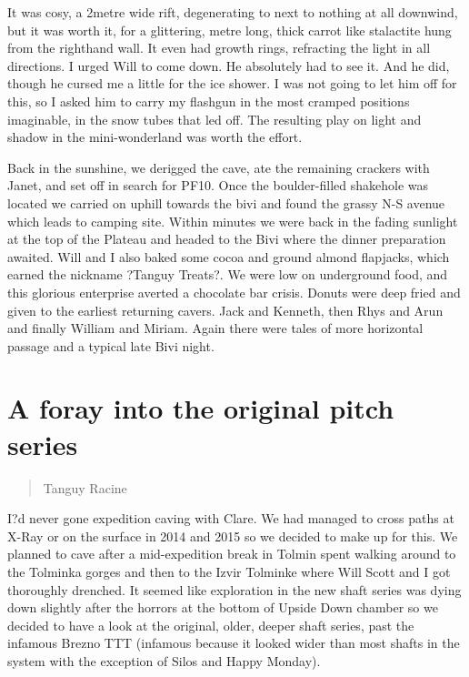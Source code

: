 \documentclass[onecolumn]{book}
\begin{document}
It was cosy, a 2metre wide rift, degenerating to next to nothing at all downwind, but it was worth it, for a glittering, metre long, thick carrot like stalactite hung from the righthand wall. It even had growth rings, refracting the light in all directions. I urged Will to come down. He absolutely had to see it. And he did, though he cursed me a little for the ice shower. I was not going to let him off for this, so I asked him to carry my flashgun in the most cramped positions imaginable, in the snow tubes that led off. The resulting play on light and shadow in the mini-wonderland was worth the effort.

Back in the sunshine, we derigged the cave, ate the remaining crackers with Janet, and set off in search for PF10. Once the boulder-filled shakehole was located we carried on uphill towards the bivi and found the grassy N-S avenue which leads to camping site. Within minutes we were back in the fading sunlight at the top of the Plateau and headed to the Bivi where the dinner preparation awaited. Will and I also baked some cocoa and ground almond flapjacks, which earned the nickname ?Tanguy Treats?. We were low on underground food, and this glorious enterprise averted a chocolate bar crisis. Donuts were deep fried and given to the earliest returning cavers. Jack and Kenneth, then Rhys and Arun and finally William and Miriam. Again there were tales of more horizontal passage and a typical late Bivi night.


\section{A foray into the original pitch series} 
 \begin{verse}
Tanguy Racine
\end{verse}


I?d never gone expedition caving with Clare. We had managed to cross paths at X-Ray or on the surface in 2014 and 2015 so we decided to make up for this. We planned to cave after a mid-expedition break in Tolmin spent walking around to the Tolminka gorges and then to the Izvir Tolminke where Will Scott and I got thoroughly drenched. It seemed like exploration in the new shaft series was dying down slightly after the horrors at the bottom of Upside Down chamber so we decided to have a look at the original, older, deeper shaft series, past the infamous Brezno TTT (infamous because it looked wider than most shafts in the system with the exception of Silos and Happy Monday).
\end{document}
